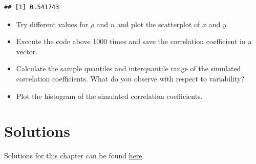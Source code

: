 \documentclass[
]{book}
\providecommand{\tightlist}{%
  \setlength{\itemsep}{0pt}\setlength{\parskip}{0pt}}
\begin{document}
\begin{verbatim}
## [1] 0.541743
\end{verbatim}

\begin{itemize}
\tightlist
\item
  Try different values for \(\rho\) and \(n\) and plot the scatterplot of \(x\) and \(y\).
\item
  Execute the code above 1000 times and save the correlation coefficient in a vector.
\item
  Calculate the sample quantiles and interquantile range of the simulated correlation coefficients.
  What do you observe with respect to variability?
\item
  Plot the histogram of the simulated correlation coefficients.
\end{itemize}

\section{Solutions}\label{solutions-1}

Solutions for this chapter can be found \href{https://github.com/jdegenfellner/Script_QM1_ZHAW/tree/main/Solutions_to_Exercises/3_Descriptive_statistics}{here}.

  
\end{document}
